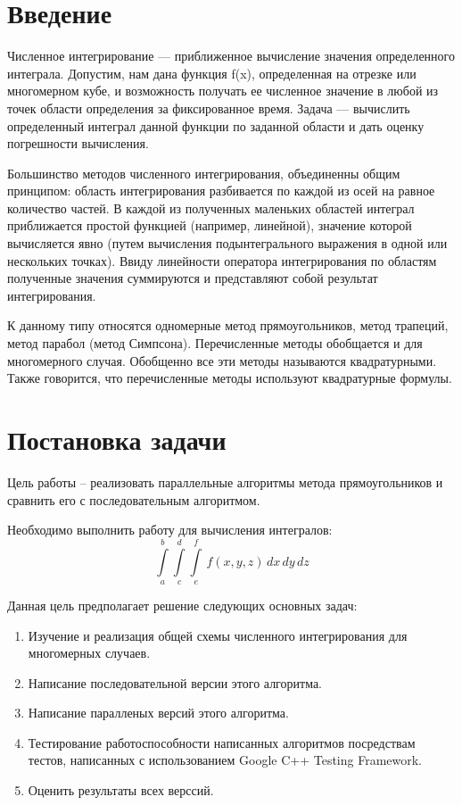 \documentclass{report}
\begin{document}
\section*{Введение}
Численное интегрирование — приближенное вычисление значения определенного интеграла. Допустим, нам дана функция f(x), определенная на отрезке или многомерном кубе, и возможность получать ее численное значение в любой из точек области определения за фиксированное время. Задача — вычислить определенный интеграл данной функции по заданной области и дать оценку погрешности вычисления.
\par Большинство методов численного интегрирования, объединенны общим принципом: область интегрирования разбивается по каждой из осей на равное количество частей. В каждой из полученных маленьких областей интеграл приближается простой функцией (например, линейной), значение которой вычисляется явно (путем вычисления подынтегрального выражения в одной или нескольких точках). Ввиду линейности оператора интегрирования по областям полученные значения суммируются и представляют собой результат интегрирования.
\par К данному типу относятся одномерные метод прямоугольников, метод трапеций, метод парабол (метод Симпсона). Перечисленные методы обобщается и для многомерного случая. Обобщенно все эти методы называются квадратурными. Также говорится, что перечисленные методы используют квадратурные формулы.
\newpage

\section*{Постановка задачи}
Цель работы – реализовать параллельные алгоритмы метода прямоугольников
и сравнить его с последовательным алгоритмом.
\par Необходимо выполнить работу для вычисления интегралов:
$$\int\limits_a^b 
\int\limits_c^d 
\int\limits_e^f \,f(x,y,z)\,dx\,dy\,dz
$$
\par Данная цель предполагает решение следующих основных задач:
\begin{enumerate}
\item Изучение и реализация общей схемы численного интегрирования для многомерных
случаев.
\item Написание последовательной версии этого алгоритма.
\item Написание паралленых версий этого алгоритма.
\item Тестирование работоспособности написанных алгоритмов посредствам тестов, написанных с использованием Google C++ Testing Framework.
\item Оценить результаты всех верссий.
\end{enumerate}
\newpage
\end{document}
